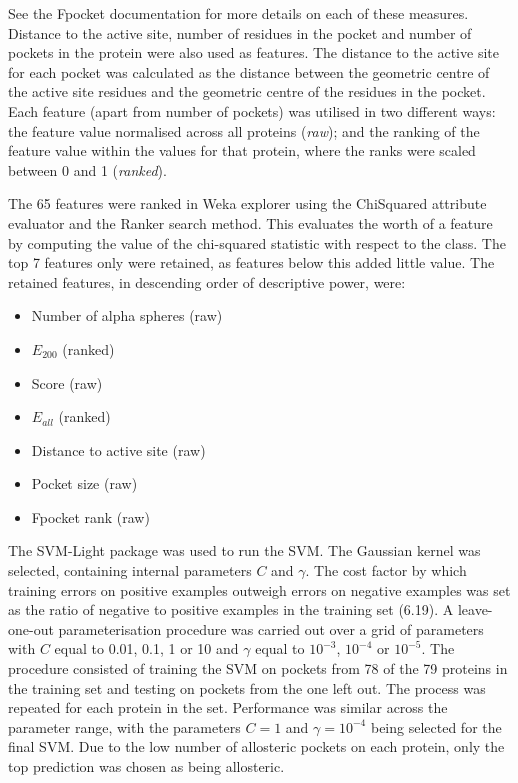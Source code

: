 See the Fpocket documentation for more details on each of these measures.
Distance to the active site, number of residues in the pocket and number of pockets in the protein were also used as features.
The distance to the active site for each pocket was calculated as the distance between the geometric centre of the active site residues and the geometric centre of the residues in the pocket.
Each feature (apart from number of pockets) was utilised in two different ways: the feature value normalised across all proteins (\emph{raw}); and the ranking of the feature value within the values for that protein, where the ranks were scaled between 0 and 1 (\emph{ranked}).

The 65 features were ranked in Weka explorer \cite{Frank2004} using the ChiSquared attribute evaluator and the Ranker search method.
This evaluates the worth of a feature by computing the value of the chi-squared statistic with respect to the class.
The top 7 features only were retained, as features below this added little value.
The retained features, in descending order of descriptive power, were:
\begin{itemize}
\item Number of alpha spheres (raw)
\item $E_{200}$ (ranked)
\item Score (raw)
\item $E_{all}$ (ranked)
\item Distance to active site (raw)
\item Pocket size (raw)
\item Fpocket rank (raw)
\end{itemize}

The SVM-Light package \cite{Joachims1998} was used to run the SVM.
The Gaussian kernel was selected, containing internal parameters $C$ and $\gamma$.
The cost factor by which training errors on positive examples outweigh errors on negative examples was set as the ratio of negative to positive examples in the training set (6.19).
A leave-one-out parameterisation procedure was carried out over a grid of parameters with $C$ equal to 0.01, 0.1, 1 or 10 and $\gamma$ equal to $10^{-3}$, $10^{-4}$ or $10^{-5}$.
The procedure consisted of training the SVM on pockets from 78 of the 79 proteins in the training set and testing on pockets from the one left out.
The process was repeated for each protein in the set.
Performance was similar across the parameter range, with the parameters $C=1$ and $\gamma=10^{-4}$ being selected for the final SVM.
Due to the low number of allosteric pockets on each protein, only the top prediction was chosen as being allosteric.


